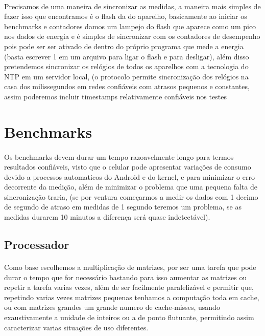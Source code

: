 \documentclass[11pt,a4paper,titlepage]{article}
\begin{document}
\paragraph{} Precisamos de uma maneira de sincronizar as medidas, a maneira mais simples de fazer isso que encontramos é o flash da  do aparelho, basicamente ao iniciar os benchmarks e contadores damos um lampejo do flash que aparece como um pico nos dados de energia e é simples de sincronizar com os contadores de desempenho pois pode ser ser ativado de dentro do próprio programa que mede a energia (basta escrever 1 em um arquivo para ligar o flash e para desligar), além disso pretendemos sincronizar os relógios de todos os aparelhos com a tecnologia do NTP em um servidor local, (o protocolo permite sincronização dos relógios na casa dos milissegundos em redes confiáveis com atrasos pequenos e constantes, assim poderemos incluir timestamps relativamente confiáveis nos testes

\section{Benchmarks} 
\paragraph{} Os benchmarks devem durar um tempo razoavelmente longo para termos resultados confiáveis, visto que o celular pode apresentar variações de consumo devido a processos automaticos do Android e do kernel, e para minimizar o erro decorrente da medição, além de minimizar o problema que uma pequena falta de sincronização traria, (se por ventura começarmos a medir os dados com 1 decimo de segundo de atraso em medidas de 1 segundo teremos um problema, se as medidas durarem 10 minutos a diferença será quase indetectável).
\subsection{Processador}
\paragraph{} Como base escolhemos a multiplicação de matrizes, por ser uma tarefa que pode durar o tempo que for necessário bastando para isso aumentar as matrizes ou repetir a tarefa varias vezes, além de ser facilmente paralelizável e permitir que, repetindo varias vezes matrizes pequenas tenhamos a computação toda em cache, ou com matrizes grandes um grande numero de cache-misses, usando exaustivamente a unidade de inteiros ou a de ponto flutuante, permitindo assim caracterizar varias situações de uso diferentes.
\end{document}
